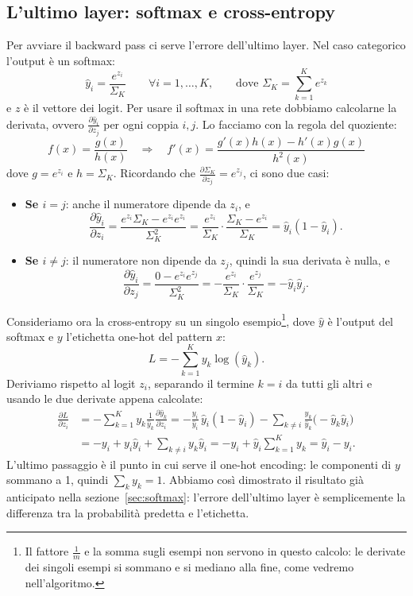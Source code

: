 \subsection{L'ultimo layer: softmax e cross-entropy}
Per avviare il backward pass ci serve l'errore dell'ultimo layer. Nel caso categorico l'output è un softmax:
\[
\hat{y}_i = \frac{e^{z_i}}{\Sigma_K} \qquad \forall i = 1, \dots, K, \qquad \text{dove } \Sigma_K = \sum_{k=1}^{K}e^{z_k}
\]
e $z$ è il vettore dei logit. Per usare il softmax in una rete dobbiamo calcolarne la derivata, ovvero $\frac{\partial \hat{y}_i}{\partial z_j}$ per ogni coppia $i, j$. Lo facciamo con la regola del quoziente:
\[
f(x) = \frac{g(x)}{h(x)} \quad \Longrightarrow \quad f'(x) = \frac{g'(x)h(x) - h'(x)g(x)}{h^2(x)}
\]
dove $g = e^{z_i}$ e $h = \Sigma_K$. Ricordando che $\frac{\partial \Sigma_K}{\partial z_j} = e^{z_j}$, ci sono due casi:
\begin{itemize}
    \item \textbf{Se $i = j$}: anche il numeratore dipende da $z_i$, e
    \[
    \frac{\partial \hat{y}_i}{\partial z_i} = \frac{e^{z_i}\Sigma_K - e^{z_i}e^{z_i}}{\Sigma_K^2} = \frac{e^{z_i}}{\Sigma_K}\cdot\frac{\Sigma_K - e^{z_i}}{\Sigma_K} = \hat{y}_i(1 - \hat{y}_i).
    \]
    \item \textbf{Se $i \neq j$}: il numeratore non dipende da $z_j$, quindi la sua derivata è nulla, e
    \[
    \frac{\partial \hat{y}_i}{\partial z_j} = \frac{0 - e^{z_i}e^{z_j}}{\Sigma_K^2} = -\frac{e^{z_i}}{\Sigma_K}\cdot\frac{e^{z_j}}{\Sigma_K} = -\hat{y}_i\hat{y}_j.
    \]
\end{itemize}

Consideriamo ora la cross-entropy su un singolo esempio\footnote{Il fattore $\frac{1}{m}$ e la somma sugli esempi non servono in questo calcolo: le derivate dei singoli esempi si sommano e si mediano alla fine, come vedremo nell'algoritmo.}, dove $\hat{y}$ è l'output del softmax e $y$ l'etichetta one-hot del pattern $x$:
\[
L = -\sum_{k=1}^{K}y_k\log(\hat{y}_k).
\]
Deriviamo rispetto al logit $z_i$, separando il termine $k = i$ da tutti gli altri e usando le due derivate appena calcolate:
\[
\begin{aligned}
\frac{\partial L}{\partial z_i} &= -\sum_{k=1}^{K}y_k\frac{1}{\hat{y}_k}\frac{\partial \hat{y}_k}{\partial z_i}
= -\frac{y_i}{\hat{y}_i}\,\hat{y}_i(1 - \hat{y}_i) - \sum_{k \neq i}\frac{y_k}{\hat{y}_k}\big(-\hat{y}_k\hat{y}_i\big) \\
&= -y_i + y_i\hat{y}_i + \sum_{k \neq i}y_k\hat{y}_i
= -y_i + \hat{y}_i\sum_{k=1}^{K}y_k = \hat{y}_i - y_i.
\end{aligned}
\]
L'ultimo passaggio è il punto in cui serve il one-hot encoding: le componenti di $y$ sommano a 1, quindi $\sum_k y_k = 1$. Abbiamo così dimostrato il risultato già anticipato nella sezione~\ref{sec:softmax}: l'errore dell'ultimo layer è semplicemente la differenza tra la probabilità predetta e l'etichetta.

